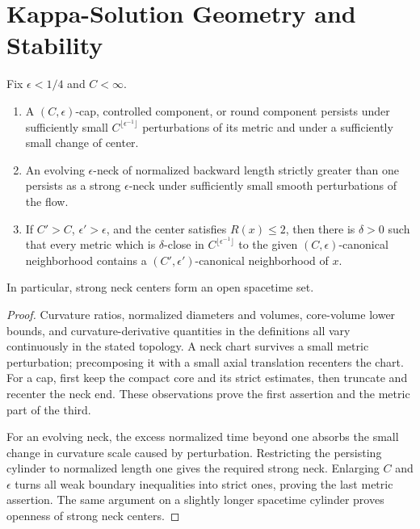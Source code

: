 \section{Kappa-Solution Geometry and Stability}

\begin{lemma}
\label{lem:canonical-neighborhood-stability}
\notready
Fix $\epsilon<1/4$ and $C<\infty$.
\begin{enumerate}
\item A $(C,\epsilon)$-cap, controlled component, or round component
      persists under sufficiently small
      $C^{\lfloor\epsilon^{-1}\rfloor}$ perturbations of its metric and
      under a sufficiently small change of center.
\item An evolving $\epsilon$-neck of normalized backward length strictly
      greater than one persists as a strong $\epsilon$-neck under
      sufficiently small smooth perturbations of the flow.
\item If $C'>C$, $\epsilon'>\epsilon$, and the center satisfies $R(x)\le2$,
      then there is $\delta>0$ such that every metric which is $\delta$-close
      in $C^{\lfloor\epsilon^{-1}\rfloor}$ to the given
      $(C,\epsilon)$-canonical neighborhood contains a
      $(C',\epsilon')$-canonical neighborhood of $x$.
\end{enumerate}
In particular, strong neck centers form an open spacetime set.
\end{lemma}

\begin{proof}
Curvature ratios, normalized diameters and volumes, core-volume lower
bounds, and curvature-derivative quantities in the definitions all vary
continuously in the stated topology.  A neck chart survives a small metric
perturbation; precomposing it with a small axial translation recenters the
chart.  For a cap, first keep the compact core and its strict estimates,
then truncate and recenter the neck end.  These observations prove the
first assertion and the metric part of the third.

For an evolving neck, the excess normalized time beyond one absorbs the
small change in curvature scale caused by perturbation.  Restricting the
persisting cylinder to normalized length one gives the required strong
neck.  Enlarging $C$ and $\epsilon$ turns all weak boundary inequalities
into strict ones, proving the last metric assertion.  The same argument on
a slightly longer spacetime cylinder proves openness of strong neck centers.
\end{proof}

